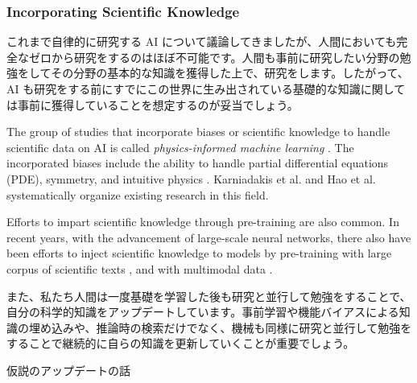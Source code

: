 







\subsubsection{Incorporating Scientific Knowledge}

これまで自律的に研究する AI について議論してきましたが、人間においても完全なゼロから研究をするのはほぼ不可能です。人間も事前に研究したい分野の勉強をしてその分野の基本的な知識を獲得した上で、研究をします。したがって、AI も研究をする前にすでにこの世界に生み出されている基礎的な知識に関しては事前に獲得していることを想定するのが妥当でしょう。

The group of studies that incorporate biases or scientific knowledge to handle scientific data on AI is called \textit{physics-informed machine learning} \cite{karniadakis2021physics}. The incorporated biases include the ability to handle partial differential equations (PDE), symmetry, and intuitive physics \cite{hao2022physics}. Karniadakis et al. \cite{karniadakis2021physics} and Hao et al. \cite{hao2022physics} systematically organize existing research in this field. 

Efforts to impart scientific knowledge through pre-training are also common. In recent years, with the advancement of large-scale neural networks, there also have been efforts to inject scientific knowledge to models by pre-training with large corpus of scientific texts \cite{taylor2022galactica,beltagy2019scibert}, and with multimodal data \cite{singhal2023towards}.

また、私たち人間は一度基礎を学習した後も研究と並行して勉強をすることで、自分の科学的知識をアップデートしています。事前学習や機能バイアスによる知識の埋め込みや、推論時の検索だけでなく、機械も同様に研究と並行して勉強をすることで継続的に自らの知識を更新していくことが重要でしょう。

仮説のアップデートの話


